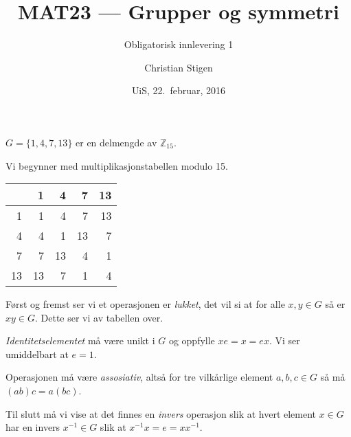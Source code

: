 \documentclass[a4paper,norsk,12pt]{article}
\title{MAT23   --- Grupper og symmetri}
\subtitle{Obligatorisk innlevering 1}
\author{Christian Stigen}
\date{UiS, 22.~februar, 2016}
\begin{document}
\maketitle

$G = \{ 1, 4, 7, 13 \}$ er en delmengde av $\mathbb{Z}_{15}$.


Vi begynner med multiplikasjonstabellen modulo 15.

\begin{table}[htp]
  \centering
  \begin{tabular}{r|rrrr}
       &  1 &  4 &  7 & 13 \\ \hline
     1 &  1 &  4 &  7 & 13 \\
     4 &  4 &  1 & 13 &  7 \\
     7 &  7 & 13 &  4 &  1 \\
    13 & 13 &  7 &  1 &  4 \\
  \end{tabular}
\end{table}

Først og fremst ser vi et operasjonen er \textit{lukket}, det vil si at for
alle $x,y \in G$ så er $xy \in G$. Dette ser vi av tabellen over.

\textit{Identitetselementet} må være unikt i $G$ og oppfylle $xe = x = ex$. Vi
ser umiddelbart at $e=1$.

Operasjonen må være \textit{assosiativ}, altså for tre vilkårlige element $a, b, c \in
G$ så må $(ab)c = a(bc)$. 

Til slutt må vi vise at det finnes en \textit{invers} operasjon slik at hvert
element $x \in G$ har en invers $x^{-1} \in G$ slik at $x^{-1}x = e = xx^{-1}$.



\end{document}
